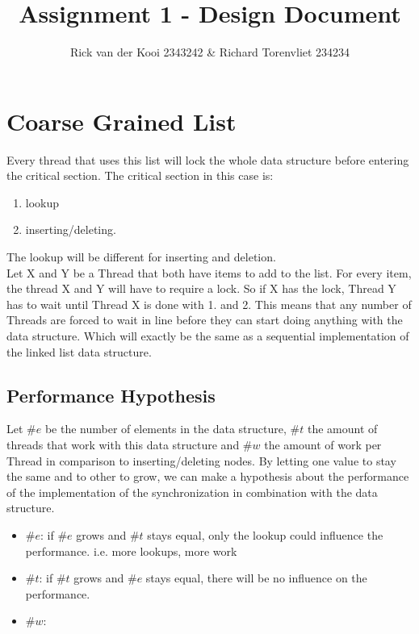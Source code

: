 \documentclass[10pt,a4paper]{article}
\author{Rick van der Kooi 2343242 \& Richard Torenvliet 234234}
\title{Assignment 1 - Design Document}
\begin{document}
\maketitle

\section{Coarse Grained List}
    Every thread that uses this list will lock the
    whole data structure before entering the critical section.
    The critical section in this case is: 
        \begin{enumerate}
        \item lookup
        \item inserting/deleting.
        \end{enumerate}
    The lookup will be different for inserting and deletion.
    \\
    Let X and Y be a Thread that both have items to add to the list. For every
    item, the thread X and Y will have to require a lock. So
    if X has the lock, Thread Y has to wait until Thread X is 
    done with 1. and 2.
    This means that any number of Threads are forced to wait in line before they can start
    doing anything with the data structure. Which will exactly be the same
    as a sequential implementation of the linked list data structure.

\subsection{Performance Hypothesis}
Let $\#e$ be the number of elements in the data structure, $\#t$ the amount of threads
that work with this data structure and $\#w$ the amount of work per Thread in
comparison to inserting/deleting nodes. By letting one value to stay the same
and to other to grow, we can make a hypothesis about the performance of the
implementation of the synchronization in combination with the data structure.
\begin{itemize}
\item $\#e$: if $\#e$ grows and $\#t$ stays equal, only the lookup could influence the performance.
    i.e. more lookups, more work
 \item $\#t$: if $\#t$ grows and $\#e$ stays equal, there will be no influence on the performance.
 \item $\#w$: 
\end{itemize}
\end{document}
